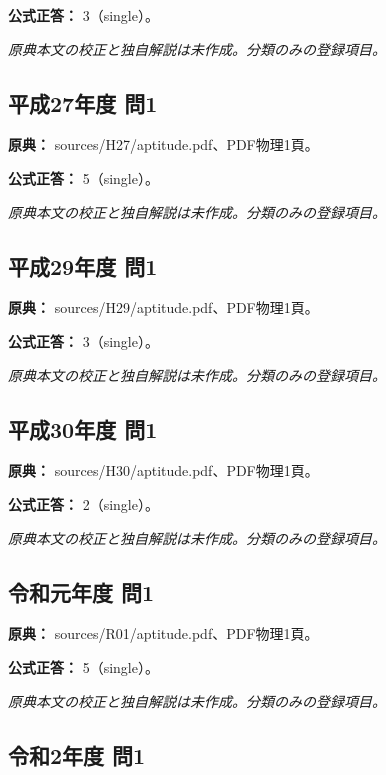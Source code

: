 \textbf{公式正答：} 3（single）。

\par\textit{原典本文の校正と独自解説は未作成。分類のみの登録項目。}

\subsection{平成27年度 問1}
\label{q:h27-reg-apt-01}

\noindent\textbf{原典：} sources/H27/aptitude.pdf、PDF物理1頁。

\textbf{公式正答：} 5（single）。

\par\textit{原典本文の校正と独自解説は未作成。分類のみの登録項目。}

\subsection{平成29年度 問1}
\label{q:h29-reg-apt-01}

\noindent\textbf{原典：} sources/H29/aptitude.pdf、PDF物理1頁。

\textbf{公式正答：} 3（single）。

\par\textit{原典本文の校正と独自解説は未作成。分類のみの登録項目。}

\subsection{平成30年度 問1}
\label{q:h30-reg-apt-01}

\noindent\textbf{原典：} sources/H30/aptitude.pdf、PDF物理1頁。

\textbf{公式正答：} 2（single）。

\par\textit{原典本文の校正と独自解説は未作成。分類のみの登録項目。}

\subsection{令和元年度 問1}
\label{q:r01-reg-apt-01}

\noindent\textbf{原典：} sources/R01/aptitude.pdf、PDF物理1頁。

\textbf{公式正答：} 5（single）。

\par\textit{原典本文の校正と独自解説は未作成。分類のみの登録項目。}

\subsection{令和2年度 問1}
\label{q:r02-reg-apt-01}

